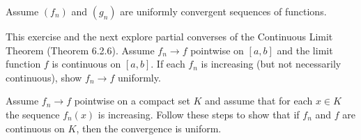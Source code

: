 \begin{exercise}
  Assume $\left(f_{n}\right)$ and $\left(g_{n}\right)$ are uniformly convergent sequences of functions.
\end{exercise}
\begin{solution}
  \TODO
\end{solution}
\begin{exercise}
  This exercise and the next explore partial converses of the Continuous Limit Theorem (Theorem 6.2.6). Assume $f_{n} \rightarrow f$ pointwise on $[a, b]$ and the limit function $f$ is continuous on $[a, b]$. If each $f_{n}$ is increasing (but not necessarily continuous), show $f_{n} \rightarrow f$ uniformly.


\end{exercise}
\begin{solution}
  \TODO
\end{solution}
\begin{exercise}
  Assume $f_{n} \rightarrow f$ pointwise on a compact set $K$ and assume that for each $x \in K$ the sequence $f_{n}(x)$ is increasing. Follow these steps to show that if $f_{n}$ and $f$ are continuous on $K$, then the convergence is uniform.
\end{exercise}
\begin{solution}
  \TODO
\end{solution}

